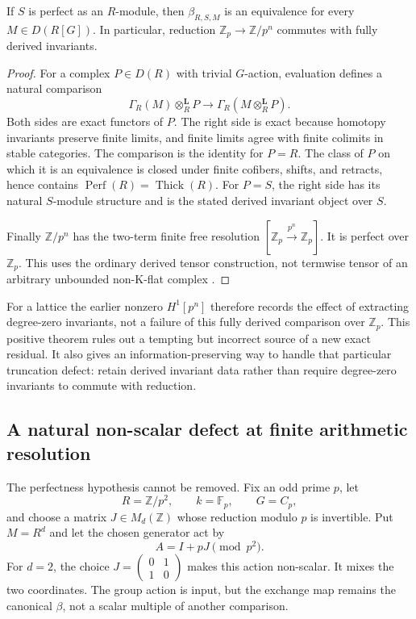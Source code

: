 \begin{theorem}\label{thm:perfect-invariant-exchange}
If $S$ is perfect as an $R$-module, then $\beta_{R,S,M}$ is an equivalence for every $M\in D(R[G])$. In particular, reduction $\mathbb Z_p\to\mathbb Z/p^n$ commutes with fully derived invariants.
\end{theorem}
\begin{proof}
For a complex $P\in D(R)$ with trivial $G$-action, evaluation defines a natural comparison
\[
 \Gamma_R(M)\otimes_R^{\mathbf L}P
 \longrightarrow\Gamma_R(M\otimes_R^{\mathbf L}P).
\]
Both sides are exact functors of $P$. The right side is exact because homotopy invariants preserve finite limits, and finite limits agree with finite colimits in stable categories. The comparison is the identity for $P=R$. The class of $P$ on which it is an equivalence is closed under finite cofibers, shifts, and retracts, hence contains $\operatorname{Perf}(R)=\operatorname{Thick}(R)$. For $P=S$, the right side has its natural $S$-module structure and is the stated derived invariant object over $S$.

Finally $\mathbb Z/p^n$ has the two-term finite free resolution $[\mathbb Z_p\xrightarrow{p^n}\mathbb Z_p]$. It is perfect over $\mathbb Z_p$. This uses the ordinary derived tensor construction, not termwise tensor of an arbitrary unbounded non-K-flat complex \cite{StacksDerivedTensor}.
\end{proof}

For a lattice the earlier nonzero $H^1[p^n]$ therefore records the effect of extracting degree-zero invariants, not a failure of this fully derived comparison over $\mathbb Z_p$. This positive theorem rules out a tempting but incorrect source of a new exact residual. It also gives an information-preserving way to handle that particular truncation defect: retain derived invariant data rather than require degree-zero invariants to commute with reduction.

\subsection{A natural non-scalar defect at finite arithmetic resolution}

The perfectness hypothesis cannot be removed. Fix an odd prime $p$, let
\[
 R=\mathbb Z/p^2,\qquad k=\mathbb F_p,\qquad G=C_p,
\]
and choose a matrix $J\in M_d(\mathbb Z)$ whose reduction modulo $p$ is invertible. Put $M=R^d$ and let the chosen generator act by
\[
 A=I+pJ\pmod{p^2}.
\]
For $d=2$, the choice $J=\left(\begin{smallmatrix}0&1\\1&0\end{smallmatrix}\right)$ makes this action non-scalar. It mixes the two coordinates. The group action is input, but the exchange map remains the canonical $\beta$, not a scalar multiple of another comparison.

